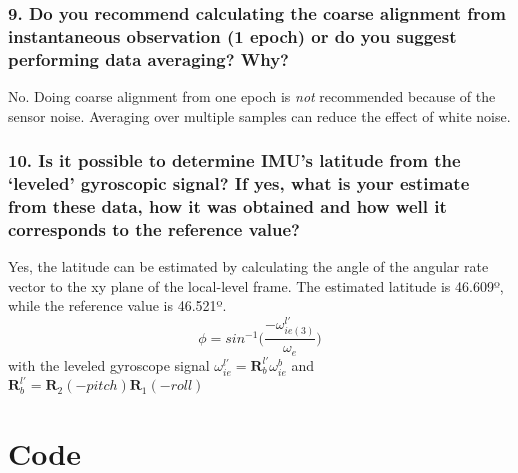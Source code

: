 \documentclass{article}
\begin{document}
\subsubsection*{9. Do you recommend calculating the coarse alignment from instantaneous
observation (1 epoch) or do you suggest performing data averaging? Why?}

No. Doing coarse alignment from one epoch is \textit{not} recommended because of the sensor noise.
Averaging over multiple samples can reduce the effect of white noise.

\subsubsection*{10. Is it possible to determine IMU’s latitude from the ‘leveled’ gyroscopic signal?
If yes, what is your estimate from these data, how it was obtained and how well
it corresponds to the reference value?}

Yes, the latitude can be estimated by calculating the angle of the angular rate 
vector to the xy plane of the local-level frame.
The estimated latitude is 46.609º, while the reference value is 46.521º.
\begin{equation*}
\phi = sin^{-1}\Big(\frac{-\omega^{l'}_{ie(3)}}{\omega_e}\Big)
\end{equation*}
with the leveled gyroscope signal $\omega^{l'}_{ie} = \mathbf{R}^{l'}_b \omega^b_{ie}$ and $\mathbf{R}^{l'}_b = \mathbf{R}_2(-pitch)\mathbf{R}_1(-roll)$

\newpage
\section*{Code}

\end{document}
